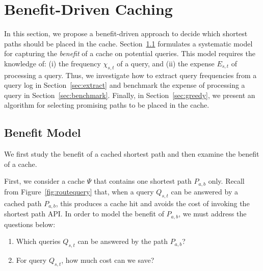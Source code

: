 \documentclass{sig-alternate}
\begin{document}
\section{Benefit-Driven Caching} \label{sec:BenefitDriven}
%
In this section, we propose a benefit-driven approach to decide which shortest paths
should be placed in the cache.
Section~\ref{sec:BenefitModel} formulates a systematic model for capturing the {\em benefit} of a cache
on potential queries. This model requires the knowledge of:
(i) the frequency $\chi_{s,t}$ of a query, and (ii) the expense $E_{s,t}$ of processing a query.
%
Thus, we investigate how to extract query frequencies from a query log in Section~\ref{sec:extract}
and benchmark the expense of processing a query in Section~\ref{sec:benchmark}.
Finally, in Section~\ref{sec:greedy}, we present an algorithm for selecting promising paths to be placed in the cache.


%







\subsection{Benefit Model}\label{sec:BenefitModel}
%
We first study the benefit of a cached shortest path
and then examine the benefit of a cache.


First, we consider a cache $\Psi$ that contains one shortest path $P_{a,b}$ only.
Recall from Figure~\ref{fig:routequery} that,
when a query $Q_{s,t}$ can be answered by a cached path $P_{a,b}$,
this produces a cache hit and avoids the cost of invoking the shortest path API.
In order to model the benefit of $P_{a,b}$, we must address the questions below:
\begin{enumerate}
    \itemsep -2pt
    \item Which queries $Q_{s,t}$ can be answered by the path $P_{a,b}$?
    \item For query $Q_{s,t}$, how much cost can we save?
\end{enumerate}
\end{document}

